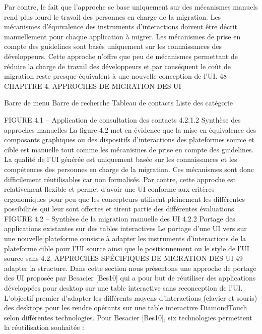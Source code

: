 \documentclass{article}
\begin{document}
Par contre, le fait que l’approche se base uniquement sur des m\'{e}canismes manuels rend plus lourd
le travail des personnes en charge de la migration. Les m\'{e}canismes d’\'{e}quivalence des instruments
d’interactions doivent \^{e}tre d\'{e}crit manuellement pour chaque application \`{a} migrer. Les m\'{e}canismes de
prise en compte des guidelines sont bas\'{e}s uniquement sur les connaissances des d\'{e}veloppeurs. Cette
approche n’offre que peu de m\'{e}canismes permettant de r\'{e}duire la charge de travail des d\'{e}veloppeurs
et par cons\'{e}quent le co\^{u}t de migration reste presque \'{e}quivalent \`{a} une nouvelle conception de l’UI.
48
CHAPITRE 4. APPROCHES DE MIGRATION DES UI
 
 
Barre de menu
Barre de recherche
Tableau de contacts
Liste des cat\'{e}gorie
 
FIGURE 4.1 – Application de consultation des contacts
4.2.1.2
Synth\`{e}se des approches manuelles
La ﬁgure 4.2 met en \'{e}vidence que la mise en \'{e}quivalence des composants graphiques ou des
dispositifs d’interactions des plateformes source et cible est manuelle tout comme les m\'{e}canismes de
prise en compte des guidelines. La qualit\'{e} de l’UI g\'{e}n\'{e}r\'{e}e est uniquement bas\'{e}e sur les connaissances
et les comp\'{e}tences des personnes en charge de la migration. Ces m\'{e}canismes sont donc difﬁcilement
r\'{e}utilisables car non formalis\'{e}s. Par contre, cette approche est relativement ﬂexible et permet d’avoir
une UI conforme aux crit\`{e}res ergonomiques pour peu que les concepteurs utilisent pleinement les
diff\'{e}rentes possibilit\'{e}s qui leur sont offertes et tirent partie des diff\'{e}rentes \'{e}valuations.
FIGURE 4.2 – Synth\`{e}se de la migration manuelle des UI
4.2.2
Portage des applications existantes sur des tables interactives
Le portage d’une UI vers sur une nouvelle plateforme consiste \`{a} adapter les instruments d’interactions de la plateforme cible pour l’UI source ainsi que le positionnement ou le style de l’UI source sans
4.2. APPROCHES SPÉCIFIQUES DE MIGRATION DES UI
49
adapter la structure. Dans cette section nous pr\'{e}sentons une approche de portage des UI propos\'{e}e par
Besacier [Bes10] qui a pour but de r\'{e}utiliser des applications d\'{e}velopp\'{e}es pour desktop sur une table
interactive sans reconception de l’UI. L’objectif premier d’adapter les diff\'{e}rents moyens d’interactions (clavier et souris) des desktops pour les rendre op\'{e}rants sur une table interactive DiamondTouch
selon diff\'{e}rentes technologies.
Pour Besacier [Bes10], six technologies permettent la r\'{e}utilisation souhait\'{e}e :
\end{document}
